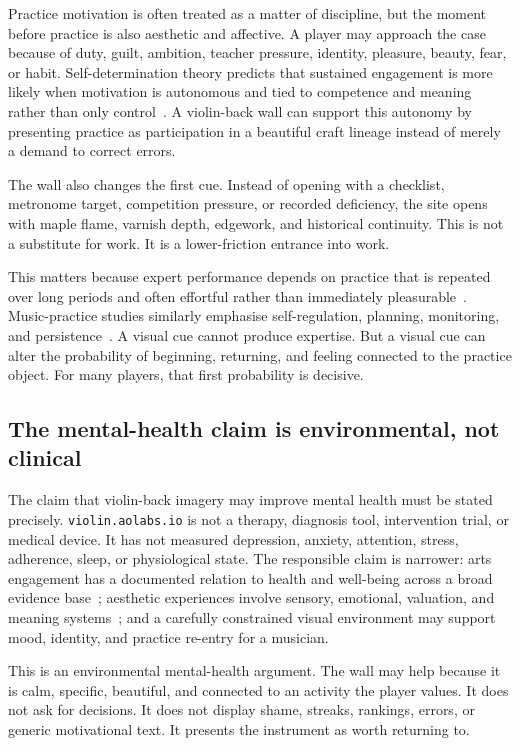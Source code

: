 \documentclass[12pt,letterpaper]{article}
\begin{document}
Practice motivation is often treated as a matter of discipline, but the moment before practice is also aesthetic and affective. A player may approach the case because of duty, guilt, ambition, teacher pressure, identity, pleasure, beauty, fear, or habit. Self-determination theory predicts that sustained engagement is more likely when motivation is autonomous and tied to competence and meaning rather than only control~\cite{ryan_self_2000}. A violin-back wall can support this autonomy by presenting practice as participation in a beautiful craft lineage instead of merely a demand to correct errors.

The wall also changes the first cue. Instead of opening with a checklist, metronome target, competition pressure, or recorded deficiency, the site opens with maple flame, varnish depth, edgework, and historical continuity. This is not a substitute for work. It is a lower-friction entrance into work.

This matters because expert performance depends on practice that is repeated over long periods and often effortful rather than immediately pleasurable~\cite{ericsson_deliberate_1993}. Music-practice studies similarly emphasise self-regulation, planning, monitoring, and persistence~\cite{mcpherson_self_2001}. A visual cue cannot produce expertise. But a visual cue can alter the probability of beginning, returning, and feeling connected to the practice object. For many players, that first probability is decisive.

\subsection{The mental-health claim is environmental, not clinical}

The claim that violin-back imagery may improve mental health must be stated precisely. \texttt{violin.aolabs.io} is not a therapy, diagnosis tool, intervention trial, or medical device. It has not measured depression, anxiety, attention, stress, adherence, sleep, or physiological state. The responsible claim is narrower: arts engagement has a documented relation to health and well-being across a broad evidence base~\cite{fancourt_arts_2019}; aesthetic experiences involve sensory, emotional, valuation, and meaning systems~\cite{chatterjee_neuroaesthetics_2014}; and a carefully constrained visual environment may support mood, identity, and practice re-entry for a musician.

This is an environmental mental-health argument. The wall may help because it is calm, specific, beautiful, and connected to an activity the player values. It does not ask for decisions. It does not display shame, streaks, rankings, errors, or generic motivational text. It presents the instrument as worth returning to.
\end{document}
